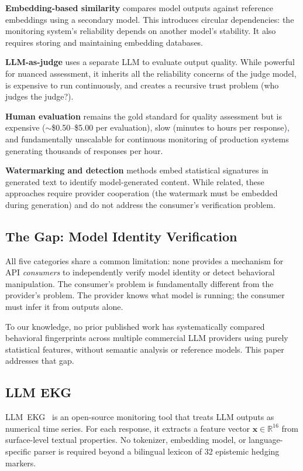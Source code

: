 \documentclass[11pt,twocolumn]{article}
\begin{document}
\textbf{Embedding-based similarity} compares model outputs against reference embeddings using a secondary model.
This introduces circular dependencies: the monitoring system's reliability depends on another model's stability.
It also requires storing and maintaining embedding databases.

\textbf{LLM-as-judge} uses a separate LLM to evaluate output quality.
While powerful for nuanced assessment, it inherits all the reliability concerns of the judge model, is expensive to run continuously, and creates a recursive trust problem (who judges the judge?).

\textbf{Human evaluation} remains the gold standard for quality assessment but is expensive ($\sim$\$0.50--\$5.00 per evaluation), slow (minutes to hours per response), and fundamentally unscalable for continuous monitoring of production systems generating thousands of responses per hour.

\textbf{Watermarking and detection} methods embed statistical signatures in generated text to identify model-generated content.
While related, these approaches require provider cooperation (the watermark must be embedded during generation) and do not address the consumer's verification problem.

\subsection{The Gap: Model Identity Verification}

All five categories share a common limitation: none provides a mechanism for API \emph{consumers} to independently verify model identity or detect behavioral manipulation.
The consumer's problem is fundamentally different from the provider's problem.
The provider knows what model is running; the consumer must infer it from outputs alone.

To our knowledge, no prior published work has systematically compared behavioral fingerprints across multiple commercial LLM providers using purely statistical features, without semantic analysis or reference models.
This paper addresses that gap.

\subsection{LLM EKG}

LLM~EKG~\cite{esteban2026llmekg} is an open-source monitoring tool that treats LLM outputs as numerical time series.
For each response, it extracts a feature vector $\mathbf{x} \in \mathbb{R}^{16}$ from surface-level textual properties.
No tokenizer, embedding model, or language-specific parser is required beyond a bilingual lexicon of 32 epistemic hedging markers.
\end{document}
